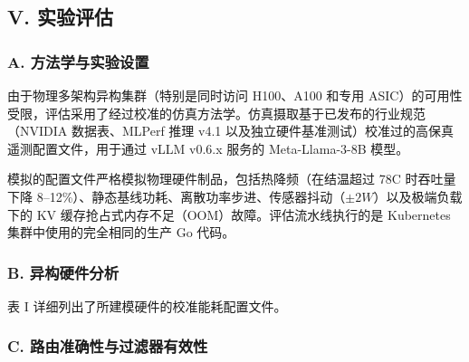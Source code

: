 \subsection{V. 实验评估}\label{v.-experimental-evaluation}

\subsubsection{A. 方法学与实验设置}\label{a.-methodology-and-experimental-setup}

由于物理多架构异构集群（特别是同时访问 H100、A100 和专用 ASIC）的可用性受限，评估采用了经过校准的仿真方法学。仿真摄取基于已发布的行业规范（NVIDIA 数据表、MLPerf 推理 v4.1 以及独立硬件基准测试）校准过的高保真遥测配置文件，用于通过 vLLM v0.6.x 服务的 Meta-Llama-3-8B 模型。

模拟的配置文件严格模拟物理硬件制品，包括热降频（在结温超过 78\textdegree C 时吞吐量下降 8--12\%）、静态基线功耗、离散功率步进、传感器抖动（\(\pm 2W\)）以及极端负载下的 KV 缓存抢占式内存不足（OOM）故障。评估流水线执行的是 Kubernetes 集群中使用的完全相同的生产 Go 代码。

\subsubsection{B. 异构硬件分析}\label{b.-heterogeneous-hardware-profiling}

表 I 详细列出了所建模硬件的校准能耗配置文件。

\begin{table}[htbp]
\centering
\caption{10 RPS 下的异构硬件配置文件}
\label{tab:hw_profiles}
\end{table}

\subsubsection{C. 路由准确性与过滤器有效性}\label{c.-routing-accuracy-and-filter-effectiveness}

